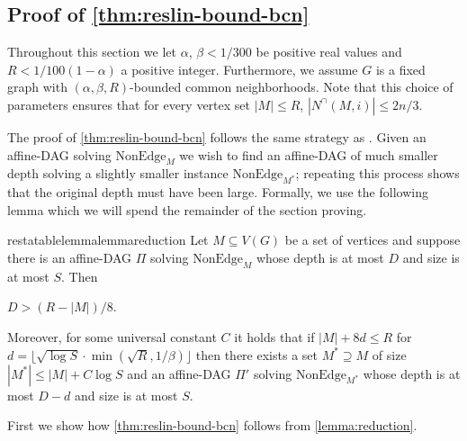 \documentclass[10pt,a4paper]{article}
\theoremstyle{definition}
\theoremstyle{remark}
\theoremstyle{example}
\theoremstyle{plain}
\newcommand{\CNbound}{R}
\newcommand{\affineDAG}{\Pi}
\newcommand{\edgeProbResLin}{\alpha}
\newcommand{\betabound}{1/300}
\newcommand{\rbound}{1/100(1-\edgeProbResLin)}
\begin{document}
\subsection{Proof of \autoref{thm:reslin-bound-bcn}}

Throughout this section we let $\edgeProbResLin$, $\beta<\betabound$ be positive real values and $\CNbound<\rbound$ a positive integer. Furthermore, we assume $G$ is a fixed graph with $(\edgeProbResLin,\beta,\CNbound)$-bounded common neighborhoods. Note that this choice of parameters ensures that for every vertex set $|M|\leq R$, $|N^\cap(M,i)|\leq2n/3$.

The proof of \autoref{thm:reslin-bound-bcn} follows the same strategy as \cite{BI25bphp}. Given an affine-DAG solving $\mathrm{NonEdge}_M$ we wish to find an affine-DAG of much smaller depth solving a slightly smaller instance $\mathrm{NonEdge}_{M^*}$; repeating this process shows that the original depth must have been large. Formally, we use the following lemma which we will spend the remainder of the section proving.

\begin{restatable}{restatablelemma}{lemmareduction}
    \label{lemma:reduction}
    Let $M\subseteq V(G)$ be a set of vertices 
    and suppose there is an affine-DAG $\affineDAG$ solving $\textrm{NonEdge}_M$ whose depth is at most $D$ and size is at most $S$. Then 

    $D>(R-|M|)/8$.
    
    Moreover, for some universal constant $C$ it holds that if $|M|+8d\leq R$ for $d=\lfloor \sqrt{\log S} \cdot \min(\sqrt\CNbound,1/\beta)\rfloor$ 
    then there exists a set
    $M^*\supseteq M$ of size $|M^*|\leq |M|+C\log S$ and an affine-DAG $\affineDAG'$ solving $\textrm{NonEdge}_{M^*}$ whose depth is at most $D-d$ and size is at most $S$. 
\end{restatable}

First we show how \autoref{thm:reslin-bound-bcn} follows from \autoref{lemma:reduction}.
\end{document}
